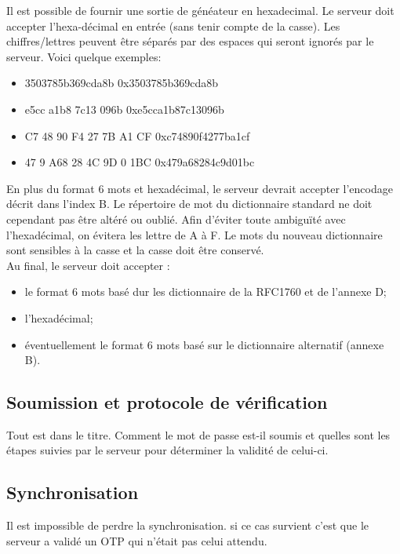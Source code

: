 \documentclass{../res/univ-projet}
\begin{document}
        Il est possible de fournir une sortie de généateur en hexadecimal. Le 
serveur doit accepter l'hexa-décimal en entrée (sans tenir compte de la casse). 
Les chiffres/lettres peuvent être séparés par des espaces qui seront ignorés 
par 
le serveur. Voici quelque exemples:
        \begin{itemize}
            \item 3503785b369cda8b              0x3503785b369cda8b
            \item e5cc a1b8 7c13 096b           0xe5cca1b87c13096b
            \item C7 48 90 F4 27 7B A1 CF       0xc74890f4277ba1cf
            \item 47 9 A68 28 4C 9D 0 1BC       0x479a68284c9d01bc
        \end{itemize}

        En plus du format 6 mots et hexadécimal, le serveur devrait accepter 
l'encodage décrit dans l'index B. Le répertoire de mot du dictionnaire standard ne doit 
cependant pas \^etre altéré ou oubli\'e. Afin d'\'eviter toute ambiguïté avec 
l'hexadécimal, on \'evitera les lettre de A à F. Le mots du nouveau dictionnaire sont 
sensibles à la casse et la casse doit être conservé.\\

        Au final, le serveur doit accepter :
        \begin{itemize}
            \item le format 6 mots basé dur les dictionnaire de la RFC1760 et de 
            l'annexe D;
            \item l'hexadécimal;
            \item éventuellement le format 6 mots basé sur le dictionnaire alternatif 
            (annexe B).
        \end{itemize}
  
  \subsection{Soumission et protocole de vérification}
    Tout est dans le titre. Comment le mot de passe est-il soumis et quelles 
sont les étapes suivies par le serveur pour déterminer la validité de celui-ci.

  \subsection{Synchronisation}
    Il est impossible de perdre la synchronisation. si ce cas survient c'est que 
    le serveur a validé un OTP qui n'était pas celui attendu.
    
\end{document}
